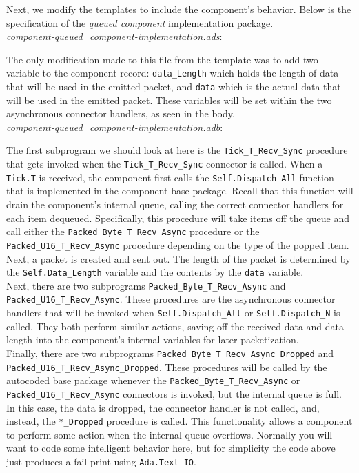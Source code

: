 Next, we modify the templates to include the component's behavior. Below is the specification of the \textit{queued component} implementation package. \\

\textit{component-queued\_component-implementation.ads}:

The only modification made to this file from the template was to add two variable to the component record: \texttt{data\_Length} which holds the length of data that will be used in the emitted packet, and \texttt{data} which is the actual data that will be used in the emitted packet. These variables will be set within the two asynchronous connector handlers, as seen in the body. \\

\textit{component-queued\_component-implementation.adb}:

The first subprogram we should look at here is the \texttt{Tick\_T\_Recv\_Sync} procedure that gets invoked when the \texttt{Tick\_T\_Recv\_Sync} connector is called. When a \texttt{Tick.T} is received, the component first calls the \texttt{Self.Dispatch\_All} function that is implemented in the component base package. Recall that this function will drain the component's internal queue, calling the correct connector handlers for each item dequeued. Specifically, this procedure will take items off the queue and call either the \texttt{Packed\_Byte\_T\_Recv\_Async} procedure or the \texttt{Packed\_U16\_T\_Recv\_Async} procedure depending on the type of the popped item. Next, a packet is created and sent out. The length of the packet is determined by the \texttt{Self.Data\_Length} variable and the contents by the \texttt{data} variable. \\

Next, there are two subprograms \texttt{Packed\_Byte\_T\_Recv\_Async} and \texttt{Packed\_U16\_T\_Recv\_Async}. These procedures are the asynchronous connector handlers that will be invoked when \texttt{Self.Dispatch\_All} or \texttt{Self.Dispatch\_N} is called. They both perform similar actions, saving off the received data and data length into the component's internal variables for later packetization. \\

Finally, there are two subprograms \texttt{Packed\_Byte\_T\_Recv\_Async\_Dropped} and \texttt{Packed\_U16\_T\_Recv\_Async\_Dropped}. These procedures will be called by the autocoded base package whenever the \texttt{Packed\_Byte\_T\_Recv\_Async} or \texttt{Packed\_U16\_T\_Recv\_Async} connectors is invoked, but the internal queue is full. In this case, the data is dropped, the connector handler is not called, and, instead, the \texttt{*\_Dropped} procedure is called. This functionality allows a component to perform some action when the internal queue overflows. Normally you will want to code some intelligent behavior here, but for simplicity the code above just produces a fail print using \texttt{Ada.Text\_IO}. \\

